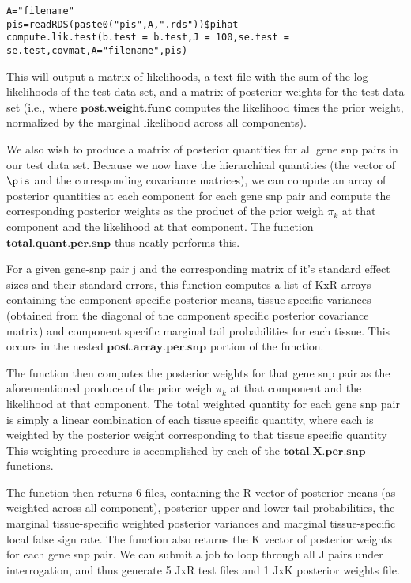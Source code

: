 \documentclass[10pt]{article}
\begin{document}
\begin{verbatim}
A="filename"
pis=readRDS(paste0("pis",A,".rds"))$pihat
compute.lik.test(b.test = b.test,J = 100,se.test = se.test,covmat,A="filename",pis) 
\end{verbatim}

This will output a matrix of likelihoods, a text file with the sum of the log-likelihoods of the test data set, and a matrix of posterior weights for the test data set (i.e., where $\textbf{post.weight.func}$ computes the likelihood times the prior weight, normalized by the marginal likelihood across all components).

We also wish to produce a matrix of posterior quantities for all gene snp pairs in our test data set. Because we now have the hierarchical quantities (the vector of $\pis$ and the corresponding covariance matrices), we can compute an array of posterior quantities at each component for each gene snp pair and compute the corresponding posterior weights as the product of the prior weigh $\pi_{k}$ at that component and the likelihood at that component. The function $\textbf{total.quant.per.snp}$ thus neatly performs this.

For a given gene-snp pair j and the corresponding matrix of it's standard effect sizes and their standard errors, this function computes a list of KxR arrays  containing the component specific posterior means, tissue-specific variances (obtained from the diagonal of the component specific posterior covariance matrix) and component specific marginal tail probabilities for each tissue. This occurs in the nested $\textbf{post.array.per.snp}$ portion of the function.

The function then computes the posterior weights for that gene snp pair as the aforementioned produce of the prior weigh $\pi_{k}$ at that component and the likelihood at that component. The total weighted quantity for each gene snp pair is simply a linear combination of each tissue specific quantity, where each is weighted by the posterior weight corresponding to that tissue specific quantity This weighting procedure is accomplished by each of the $\textbf{total.X.per.snp}$ functions.

The function then returns  6 files, containing the R vector of posterior means (as weighted across all component), posterior upper and lower tail probabilities, the marginal tissue-specific weighted posterior variances and marginal tissue-specific local false sign rate. The function also returns the K vector of posterior weights for each gene snp pair. We can submit a job to loop through all J pairs under interrogation, and thus generate 5 JxR test files and 1 JxK posterior weights file.
\end{document}
